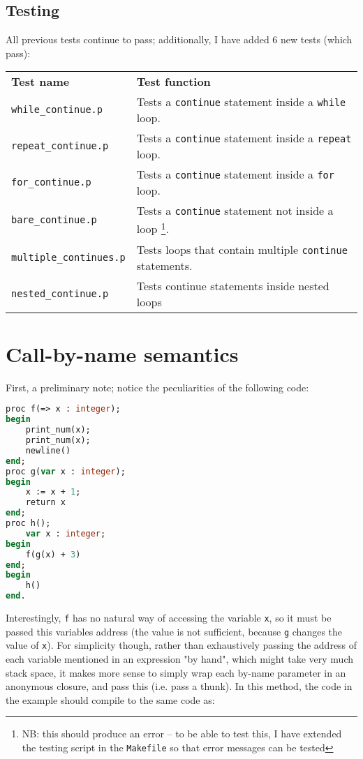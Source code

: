 \documentclass[a4paper,9pt]{article}
\begin{document}
\subsection{Testing}
All previous tests continue to pass; additionally, I have added 6 new tests (which pass): \\
\begin{tabularx}{\linewidth}{ |X|X| }
\hline
    \textbf{Test name} & \textbf{Test function} \\
\hhline{|=|=|}
    \texttt{while\_continue.p} & Tests a \texttt{continue} statement inside a \texttt{while} loop. \\
\hline
    \texttt{repeat\_continue.p} & Tests a \texttt{continue} statement inside a \texttt{repeat} loop. \\
\hline
    \texttt{for\_continue.p} & Tests a \texttt{continue} statement inside a \texttt{for} loop. \\
\hline
    \texttt{bare\_continue.p} & Tests a \texttt{continue} statement not inside a loop \footnote{NB: this should produce an error -- to be able to test this, I have extended the testing script in the \texttt{Makefile} so that error messages can be tested}. \\
\hline
    \texttt{multiple\_continues.p} & Tests loops that contain multiple \texttt{continue} statements. \\
\hline
    \texttt{nested\_continue.p} & Tests continue statements inside nested loops \\
\hline
\end{tabularx}

\section{Call-by-name semantics}
First, a preliminary note; notice the peculiarities of the following code:
\begin{lstlisting}[language=pascal]
proc f(=> x : integer);
begin
    print_num(x);
    print_num(x);
    newline()
end;
proc g(var x : integer);
begin
    x := x + 1;
    return x
end;
proc h();
    var x : integer;
begin
    f(g(x) + 3)
end;
begin
    h()
end.
\end{lstlisting}

Interestingly, \texttt{f} has no natural way of accessing the variable \texttt{x}, so it must be passed this variables address (the value is not sufficient, because \texttt{g} changes the value of \texttt{x}). For simplicity though, rather than exhaustively passing the address of each variable mentioned in an expression "by hand", which might take very much stack space, it makes more sense to simply wrap each by-name parameter in an anonymous closure, and pass this (i.e. pass a thunk). In this method, the code in the example should compile to the same code as:
\end{document}
